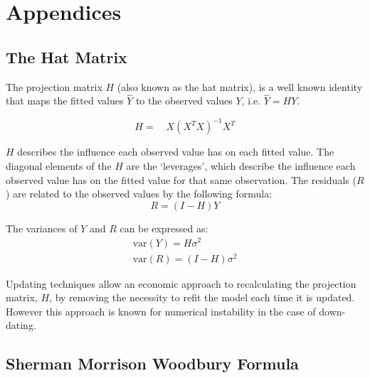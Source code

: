 
\chapter{Appendices} %
\newpage
\section{The Hat Matrix} %

The projection matrix $H$ (also known as the hat matrix), is a
well known identity that maps the fitted values $\hat{Y}$ to the
observed values $Y$, i.e. $\hat{Y} = HY$.

\begin{equation}
H =\quad X(X^{T}X)^{-1}X^{T}
\end{equation}

$H$ describes the influence each observed value has on each fitted
value. The diagonal elements of the $H$ are the `leverages', which
describe the influence each observed value has on the fitted value
for that same observation. The residuals ($R$) are related to the
observed values by the following formula:
\begin{equation}
R = (I-H)Y
\end{equation}

The variances of $Y$ and $R$ can be expressed as:
\begin{eqnarray}
\mbox{var}(Y) = H\sigma^{2} \nonumber\\
\mbox{var}(R) = (I-H)\sigma^{2}
\end{eqnarray}

Updating techniques allow an economic approach to recalculating
the projection matrix, $H$, by removing the necessity to refit the
model each time it is updated. However this approach is known for
numerical instability in the case of down-dating.

\section{Sherman Morrison Woodbury Formula} %

